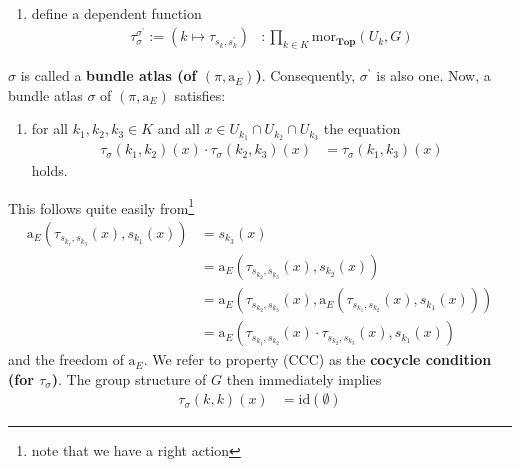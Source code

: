 \begin{exa}[Bundles 2]
\begin{enumerate}
\begin{align*}
  \mathrm{mor}_{\mathbf{Top}}(U_{k},E)
  \\
  \tau_{\sigma^{\backprime}}
  :=
  \left(
    (k_{1},k_{2})
    \mapsto
    \tau_{s_{k_{1}}^{\backprime},s_{k_{2}}^{\backprime}}
  \right)
  &\colon
  \prod_{(k_{1},k_{2}) \in K \times K}
  \mathrm{mor}_{\mathbf{Top}}(U_{k_{1}} \cap U_{k_{2}},G)
\end{align*}
\item[$\bullet$]
define a dependent function
\begin{align*}
  \tau_{\sigma}^{\sigma^{\backprime}}
  :=
  \left(
    k
    \mapsto
    \tau_{s_{k},s_{k}^{\backprime}}
  \right)
  &\colon
  \prod_{k \in K}
  \mathrm{mor}_{\mathbf{Top}}(U_{k},G)
\end{align*}
\end{enumerate}
$\sigma$ is called a \textbf{bundle atlas (of $(\pi,\mathrm{a}_{E})$)}.
Consequently, $\sigma^{\backprime}$ is also one.
Now, a bundle atlas $\sigma$ of $(\pi,\mathrm{a}_{E})$ satisfies:
\begin{enumerate}
\item[(CCC)]
for all $k_{1},k_{2},k_{3} \in K$ and all $x \in U_{k_{1}} \cap U_{k_{2}} \cap U_{k_{3}}$ the equation
\begin{align*}
  \tau_{\sigma}(k_{1},k_{2})(x)
  \cdot
  \tau_{\sigma}(k_{2},k_{3})(x)
  &=
  \tau_{\sigma}(k_{1},k_{3})(x)
\end{align*}
holds.
\end{enumerate}
This follows quite easily from\footnote{note that we have a right action}
\begin{align*}
  \mathrm{a}_{E}
  \left(
    \tau_{s_{k_{1}},s_{k_{3}}}(x),
    s_{k_{1}}(x)
  \right)
  &=
  s_{k_{3}}(x)
  \\
  &=
  \mathrm{a}_{E}
  \left(
    \tau_{s_{k_{2}},s_{k_{3}}}(x),
    s_{k_{2}}(x)
  \right)
  \\
  &=
  \mathrm{a}_{E}
  \left(
    \tau_{s_{k_{2}},s_{k_{3}}}(x),
    \mathrm{a}_{E}
    \left(
      \tau_{s_{k_{1}},s_{k_{2}}}(x),
      s_{k_{1}}(x)
    \right)
  \right)
  \\
  &=
  \mathrm{a}_{E}
  \left(
    \tau_{s_{k_{1}},s_{k_{2}}}(x)
    \cdot
    \tau_{s_{k_{2}},s_{k_{3}}}(x),
    s_{k_{1}}(x)
  \right)
\end{align*}
and the freedom of $\mathrm{a}_{E}$.
We refer to property (CCC) as the \textbf{cocycle condition (for $\tau_{\sigma}$)}.
The group structure of $G$ then immediately implies
\begin{align*}
  \tau_{\sigma}(k,k)(x)
  &=
  \mathrm{id}(\emptyset)

\end{align*}
\end{exa}

